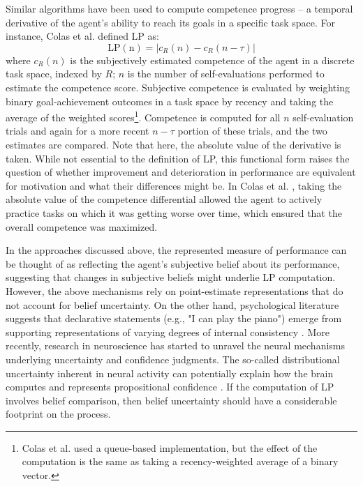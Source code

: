 Similar algorithms have been used to compute competence progress \cite{baranes_active_2013,santucci_which_2013,colas_curious_2019,forestier_intrinsically_2020} -- a temporal derivative of the agent's ability to reach its goals in a specific task space. For instance, Colas et al. \cite{colas_curious_2019} defined \ac{LP} as:
\begin{equation}
    \mathrm{LP(n)} = |c_R(n) - c_R(n-\tau)|
\end{equation}
where $c_R(n)$ is the subjectively estimated competence of the agent in a discrete task space, indexed by $R$; $n$ is the number of self-evaluations performed to estimate the competence score. Subjective competence is evaluated by weighting binary goal-achievement outcomes in a task space by recency and taking the average of the weighted scores\footnote{Colas et al. \cite{colas_curious_2019} used a queue-based implementation, but the effect of the computation is the same as taking a recency-weighted average of a binary vector.}. Competence is computed for all $n$ self-evaluation trials and again for a more recent $n-\tau$ portion of these trials, and the two estimates are compared. Note that here, the absolute value of the derivative is taken. While not essential to the definition of \ac{LP}, this functional form raises the question of whether improvement and deterioration in performance are equivalent for motivation and what their differences might be. In Colas et al. \cite{colas_curious_2019}, taking the absolute value of the competence differential allowed the agent to actively practice tasks on which it was getting worse over time, which ensured that the overall competence was maximized.

In the approaches discussed above, the represented measure of performance can be thought of as reflecting the agent's subjective belief about its performance, suggesting that changes in subjective beliefs might underlie \ac{LP} computation. However, the above mechanisms rely on point-estimate representations that do not account for belief uncertainty. On the other hand, psychological literature suggests that declarative statements (e.g., "I can play the piano") emerge from supporting representations of varying degrees of internal consistency \cite{smith_belief_1991,koriat_self-consistency_2012}. More recently, research in neuroscience has started to unravel the neural mechanisms underlying uncertainty and confidence judgments. The so-called distributional uncertainty inherent in neural activity can potentially explain how the brain computes and represents propositional confidence \cite{meyniel_confidence_2015,pouget_confidence_2016}. If the computation of \ac{LP} involves belief comparison, then belief uncertainty should have a considerable footprint on the process. 

